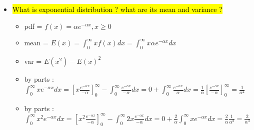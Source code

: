 \documentclass[10pt,landscape,a4paper]{article}
\begin{document}
\begin{multicols*}{4}
\begin{spacing}{0.1}
\begin{itemize}
\item \hl{What is exponential distribution ? what are its mean and variance ?}
\begin{itemize}
	\item pdf = $f(x) = \alpha e^{-\alpha x} , x \ge 0$
	\item mean = $E(x)=\int_{0}^{\infty} x f(x) dx = \int_{0}^{\infty} x \alpha e^{-\alpha x} dx $
	\item var = $E(x^2) - E(x)^2$
	\item by parts : $\int_{0}^{\infty} x e^{-\alpha x} dx = [x \frac{e^{-\alpha x}}{-\alpha}]_{0}^{\infty} - \int_{0}^{\infty} \frac{e^{-\alpha x}}{-\alpha} dx = 0 + \int_{0}^{\infty} \frac{e^{-\alpha x}}{\alpha} dx = \frac{1}{\alpha} [\frac{e^{-\alpha x}}{-\alpha}]_{0}^{\infty} = \frac{1}{\alpha^2} $
	\item by parts : $\int_{0}^{\infty} x^2 e^{-\alpha x} dx = [x^2 \frac{e^{-\alpha x}}{-\alpha} ]_{0}^{\infty} - \int_{0}^{\infty} 2x \frac{e^{-\alpha x}}{-\alpha} dx = 0 +  \frac{2}{\alpha} \int_{0}^{\infty} x e^{-\alpha x} dx = \frac{2}{\alpha} \frac{1}{\alpha^2} = \frac{2}{\alpha^3}  $
\end{itemize}


\end{itemize}

\end{spacing}
\end{multicols*}
\end{document}
